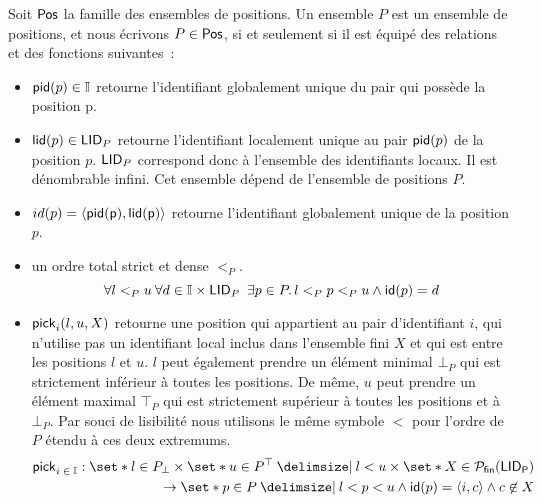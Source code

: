 \begin{definition}[Positions]\label{def:pos}
Soit $\trm{Pos}$ la famille des ensembles de positions.
Un ensemble $P$ est un ensemble de positions, et nous écrivons $P \in \trm{Pos}$, si et seulement si il est équipé des relations et des fonctions suivantes~:
\begin{itemize}
\item $\trm{pid}(p) \in \mathbb{I}$ retourne l'identifiant globalement unique du pair qui possède la position p.

\item $\trm{lid}(p) \in \trm{LID}_P$ retourne l'identifiant localement unique au pair $\trm{pid}(p)$ de la position $p$.
$\trm{LID}_P$ correspond donc à l'ensemble des identifiants locaux.
Il est dénombrable infini.
Cet ensemble dépend de l'ensemble de positions $P$.

\item $id(p) = \tuple*{\trm{\trm{pid}(p), \trm{lid}(p)}}$ retourne l'identifiant globalement unique de la position $p$.
\item un ordre total strict et dense $<_P$.
\begin{equation*}
\forall l <_P u \:\forall d \in \mathbb{I} \times \trm{LID}_P\ \exists p \in P \qsep l <_P p <_P u \land \trm{id}(p) = d
\end{equation*}

\item $\trm{pick}_i(l, u, X)$ retourne une position qui appartient au pair d'identifiant $i$, qui n'utilise pas un identifiant local inclus dans l'ensemble fini $X$ et qui est entre les positions $l$ et $u$.
$l$ peut également prendre un élément minimal $\bot_P$ qui est strictement inférieur à toutes les positions.
De même, $u$ peut prendre un élément maximal $\top_P$ qui est strictement supérieur à toutes les positions et à $\bot_P$.
Par souci de lisibilité nous utilisons le même symbole $<$ pour l'ordre de $P$ étendu à ces deux extremums.
\begin{equation*}\begin{split}
    \trm{pick}_{i\;\in\;\mathbb{I}}: \set*{l \in P_{\bot}} \times \set*{u \in P^{\top} \given l < u} \times \set*{X \in \powerfset{\trm{LID_P}}}\\
    \to \set*{p \in P \given l < p < u \land \trm{id}(p) = \tuple*{i, c} \land c \not\in X}
\end{split}\end{equation*}
\end{itemize}
\end{definition}

